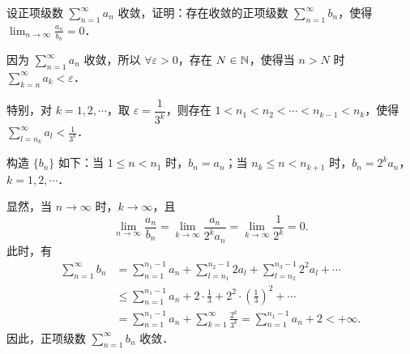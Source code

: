 设正项级数 $\displaystyle \sum_{n=1}^{\infty}a_n$ 收敛，证明：存在收敛的正项级数 $\displaystyle \sum_{n=1}^{\infty}b_n$，使得 $\displaystyle \lim_{n\to\infty}\frac{a_n}{b_n}=0$．
\begin{solution}
因为 $\displaystyle \sum_{n=1}^{\infty}a_n$ 收敛，所以 $\forall\varepsilon>0$，存在 $N\in\mathbb{N}$，使得当 $n>N$ 时 $\displaystyle \sum_{k=n}^{\infty}a_k<\varepsilon$．

特别，对 $k=1,2,\cdots$，取 $\varepsilon=\dfrac{1}{3^k}$，则存在 $1<n_1<n_2<\cdots<n_{k-1}<n_k$，使得 $\displaystyle \sum_{l=n_k}^{\infty}a_l<\frac{1}{3^k}$．

构造 $\{b_n\}$ 如下：当 $1\le n<n_1$ 时，$b_n=a_n$；当 $n_k\le n<n_{k+1}$ 时，$b_n=2^ka_n$，$k=1,2,\cdots$．

显然，当 $n\to\infty$ 时，$k\to\infty$，且
\[
\lim_{n\to\infty}\frac{a_n}{b_n}=\lim_{k\to\infty}\frac{a_n}{2^ka_n}=\lim_{k\to\infty}\frac{1}{2^k}=0.
\]
此时，有
\begin{align*}
\sum_{n=1}^{\infty}b_n&=\sum_{n=1}^{n_1-1}a_n+\sum_{l=n_1}^{n_2-1}2a_l+\sum_{l=n_2}^{n_3-1}2^2a_l+\cdots\\
&\le\sum_{n=1}^{n_1-1}a_n+2\cdot\frac13+2^2\cdot\left(\frac13\right)^2+\cdots\\
&=\sum_{n=1}^{n_1-1}a_n+\sum_{k=1}^{\infty}\frac{2^k}{3^k}=\sum_{n=1}^{n_1-1}a_n+2<+\infty.
\end{align*}
因此，正项级数 $\displaystyle \sum_{n=1}^{\infty}b_n$ 收敛．
\end{solution}
